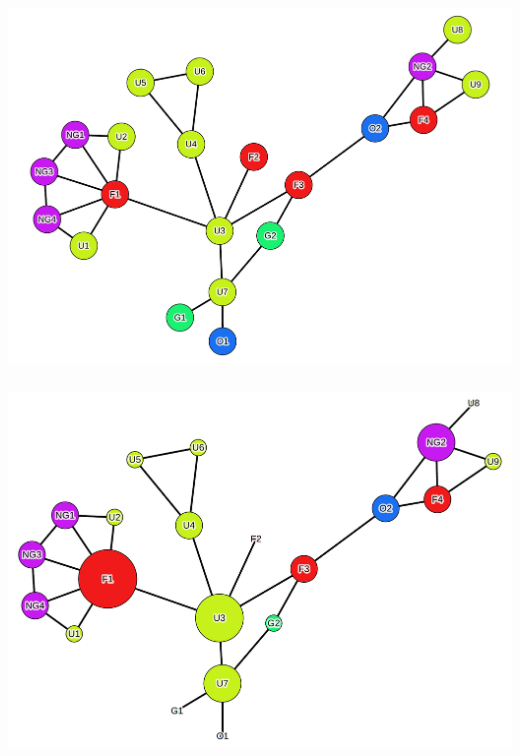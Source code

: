 \documentclass[8pt]{beamer}
\begin{document}
\begin{frame}
\frametitle{\insertsection}
    
\centering
\includegraphics[width=0.9\linewidth,height=\textheight,keepaspectratio]{exercise_gephi}
     
\end{frame}



\begin{frame}
\frametitle{\insertsection}
    
\centering
\includegraphics[width=0.9\linewidth,height=\textheight,keepaspectratio]{exercise_degree_gephi}
     
\end{frame}



\end{document}
